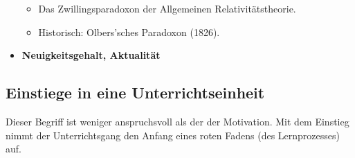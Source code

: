 \begin{itemize}
\begin{beisp}
\begin{itemize}
		\item
		Das Zwillingsparadoxon der Allgemeinen Relativit\"{a}tstheorie.
		
		\item
		Historisch: Olbers'sches Paradoxon (1826).
		\end{itemize}
	\end{beisp}
	
	
	
	\item {\bf Neuigkeitsgehalt, Aktualit\"{a}t}
\end{itemize}

\subsection{Einstiege in eine Unterrichtseinheit}

Dieser Begriff ist weniger anspruchsvoll als der der Motivation.
Mit dem Einstieg nimmt der Unterrichtsgang den Anfang eines
roten Fadens (des Lernprozesses) auf.

